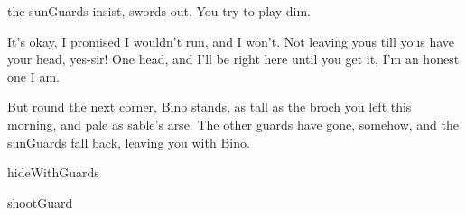 the \glspl{sunGuard} insist, swords out.
You try to play dim.

\begin{speechtext}
  It's okay, I promised I wouldn't run, and I won't.
  Not leaving yous till yous have your head, yes-sir!
  One head, and I'll be right here until you get it, I'm an honest one I am.
\end{speechtext}

But round the next corner, Bino stands, as tall as the broch you left this morning, and pale as \gls{sable}'s arse.
The other \glspl{guard} have gone, somehow, and the \glspl{sunGuard} fall back, leaving you with Bino.

\begin{selectPath}
  {}%
  {hideWithGuards}

  {}%
  {shootGuard}
\end{selectPath}
